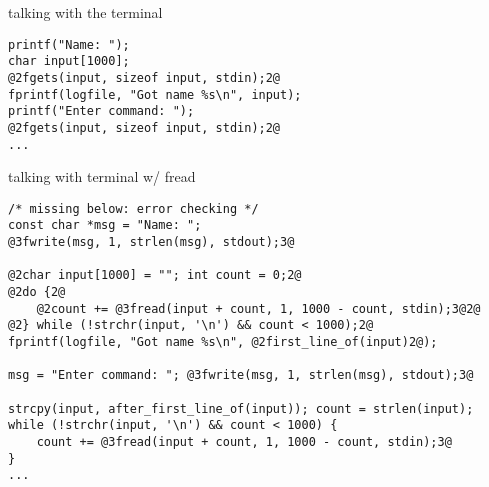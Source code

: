 \begin{frame}[fragile]{talking with the terminal}
\begin{lstlisting}
printf("Name: ");
char input[1000];
@2fgets(input, sizeof input, stdin);2@
fprintf(logfile, "Got name %s\n", input);
printf("Enter command: ");
@2fgets(input, sizeof input, stdin);2@
...
\end{lstlisting}
\end{frame}

\begin{frame}[fragile]{talking with terminal w/ fread}
\begin{lstlisting}
/* missing below: error checking */
const char *msg = "Name: ";
@3fwrite(msg, 1, strlen(msg), stdout);3@

@2char input[1000] = ""; int count = 0;2@
@2do {2@
    @2count += @3fread(input + count, 1, 1000 - count, stdin);3@2@
@2} while (!strchr(input, '\n') && count < 1000);2@
fprintf(logfile, "Got name %s\n", @2first_line_of(input)2@);

msg = "Enter command: "; @3fwrite(msg, 1, strlen(msg), stdout);3@

strcpy(input, after_first_line_of(input)); count = strlen(input);
while (!strchr(input, '\n') && count < 1000) {
    count += @3fread(input + count, 1, 1000 - count, stdin);3@
}
...
\end{lstlisting}
\end{frame}

